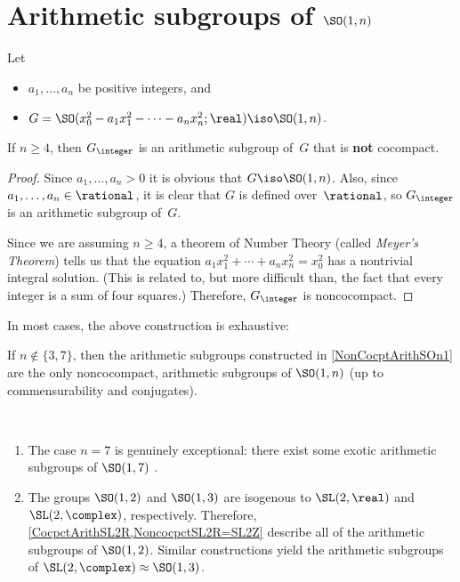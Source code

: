 \section{Arithmetic subgroups of \texorpdfstring{$\SO(1,\lowercase{n})$}{SO(1,n)}}
\label{ArithSO1nSect}

\begin{prop} \label{NonCocptArithSOn1}
 Let
 \begin{itemize}
  \item $a_1,\ldots,a_n$ be positive integers,
  and
   \item $G = \SO(x_0^2 - a_1 x_1^2 - \cdots - a_n x_n^2;
\real) \iso \SO(1,n)$. 
 \end{itemize}
 If $n \ge 4$, then $G_{\integer}$ is an arithmetic subgroup of~$G$ that is \textbf{not} cocompact.
 \end{prop}

\begin{proof}
Since $a_1,\ldots,a_n > 0$ it is obvious that $G \iso \SO(1,n)$. Also, since $a_1,\ldots,a_n \in \rational$, it is clear that $G$ is defined over~$\rational$, so $G_\integer$ is an arithmetic subgroup of~$G$.

Since we are assuming $n \ge 4$, a theorem of Number Theory (called \emph{Meyer's Theorem}) tells us that the equation $a_1 x_1^2 + \cdots + a_n x_n^2 = x_0^2$ has a nontrivial integral solution. (This is related to, but more difficult than, the fact that every integer is a sum of four squares.) Therefore, $G_{\integer}$ is noncocompact.
\end{proof}

In most cases, the above construction is exhaustive:

\begin{prop} \label{SO1nNotCpctListStated}
 If $n \notin \{3,7\}$, then the arithmetic subgroups constructed in
\cref{NonCocptArithSOn1} are the only noncocompact, arithmetic subgroups of\/
$\SO(1,n)$ \textup(up to commensurability and
conjugates\textup).
 \end{prop}
 
\begin{rems} \ 
\noprelistbreak
\begin{enumerate}
\item The case $n = 7$ is genuinely exceptional: there exist some exotic
arithmetic subgroups of $\SO(1,7)$ \csee{D4weird}. 
\item The groups $\SO(1,2)$ and $\SO(1,3)$ are isogenous to $\SL(2,\real)$ and $\SL(2,\complex)$, respectively. Therefore, \cref{CocpctArithSL2R,NoncocpctSL2R=SL2Z} describe all of the arithmetic subgroups of $\SO(1,2)$. Similar constructions yield the arithmetic subgroups of $\SL(2,\complex) \approx \SO(1,3)$.
\end{enumerate}
 \end{rems}

